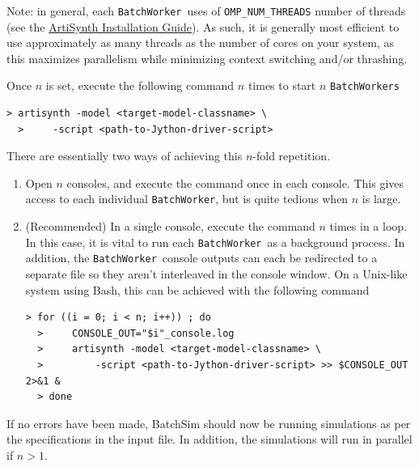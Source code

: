 \documentclass{article}
\newcommand{\BW}{{\tt BatchWorker}}
\newcommand{\BWs}{{\tt BatchWorkers}}
\begin{document}
\begin{sideblock}
Note: in general, each \BW\ uses of {\tt OMP\_NUM\_THREADS} number of threads (see the \href{https://www.artisynth.org/Documentation/InstallGuide}{ArtiSynth Installation Guide}). As such, it is generally most efficient to use approximately as many threads as the number of cores on your system, as this maximizes parallelism while minimizing context switching and/or thrashing.
\end{sideblock}

Once $n$ is set, execute the following command $n$ times to start $n$ \BWs

\begin{lstlisting}[]
  > artisynth -model <target-model-classname> \
  >     -script <path-to-Jython-driver-script>
\end{lstlisting}

There are essentially two ways of achieving this $n$-fold repetition.

\begin{enumerate}

\item Open $n$ consoles, and execute the command once in each console. This gives access to each individual \BW, but is quite tedious when $n$ is large.

\item (Recommended) In a single console, execute the command $n$ times in a loop. In this case, it is vital to run each \BW\ as a background process. In addition, the \BW\ console outputs can each be redirected to a separate file so they aren't interleaved in the console window. On a Unix-like system using Bash, this can be achieved with the following command

\begin{lstlisting}[]
  > for ((i = 0; i < n; i++)) ; do
  >     CONSOLE_OUT="$i"_console.log
  >     artisynth -model <target-model-classname> \
  >         -script <path-to-Jython-driver-script> >> $CONSOLE_OUT 2>&1 &
  > done
\end{lstlisting}

\end{enumerate}

If no errors have been made, BatchSim should now be running simulations as per the specifications in the input file. In addition, the simulations will run in parallel if $n > 1$.
\end{document}
